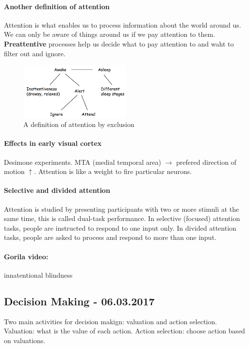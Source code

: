 \documentclass[12pt,article,oneside,a4paper]{memoir}
\begin{document}
\paragraph{Another definition of attention} Attention is what enables us to
process information about the world around us. We can only be aware of things
around us if we pay attention to them. \textbf{Preattentive} processes help us
decide what to pay attention to and waht to filter out and ignore.

\begin{figure}[h]
  \centering
  \includegraphics[width=0.5\textwidth]{imgs/attention.png}
  \caption{A definition of attention by exclusion}
  \label{fig:attention}
\end{figure}

\paragraph{Effects in early visual cortex}
Desimone experiments. MTA (medial temporal area) $\rightarrow$ prefered
direction of motion $\uparrow$. Attention is like a weight to fire particular
neurons.

\paragraph{Selective and divided attention}
Attention is studied by presenting participants with two or more stimuli at the
same time, this is called dual-task performance. In selective (focused)
attention tasks, people are instructed to respond to one input only. In divided
attention tasks, people are asked to process and respond to more than one input.

\paragraph{Gorila video:} innatentional blindness

\newpage
\subsection{Decision Making - 06.03.2017}
Two main activities for decision makign: valuation and action selection.
Valuation: what is the value of each action. Action selection: choose action
based on valuations.
\end{document}

